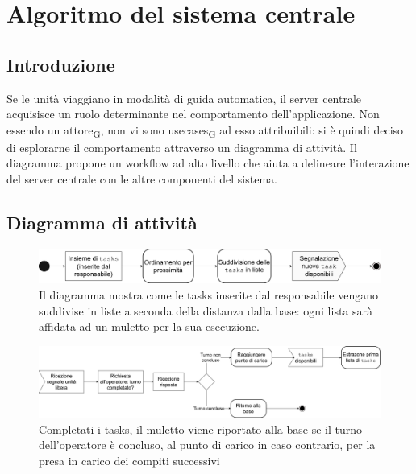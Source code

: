 \section{Algoritmo del sistema centrale}
\subsection{Introduzione}
Se le unità viaggiano in modalità di guida automatica, il server centrale acquisisce un ruolo determinante nel comportamento dell'applicazione. Non essendo un \gls{attore}\textsubscript{G}, non vi sono \glspl{usecase}\textsubscript{G} ad esso attribuibili: si è quindi deciso di esplorarne il comportamento attraverso un diagramma di attività. Il diagramma propone un workflow ad alto livello che aiuta a delineare l'interazione del server centrale con le altre componenti del sistema.



\subsection{Diagramma di attività}

\begin{figure}[H]
	\centering
	\includegraphics[scale=0.35]{res/images/diagramma_di_attivita3.png}
	\caption[Diagramma di attività per l'ordinamento  delle tasks]{Il diagramma mostra come le tasks inserite dal responsabile vengano suddivise in liste a seconda della distanza dalla base: ogni lista sarà affidata ad un muletto per la sua esecuzione.}
\end{figure}

\begin{figure}[H]
	\centering
	\includegraphics[scale=0.35]{res/images/diagramma_di_attivita1.png}
	\caption[Diagramma di attività per la gestione del muletto dopo il completamento della lista di tasks]{Completati i tasks, il muletto viene riportato alla base se il turno dell'operatore è concluso, al punto di carico in caso contrario, per la presa in carico dei compiti successivi}
\end{figure}



